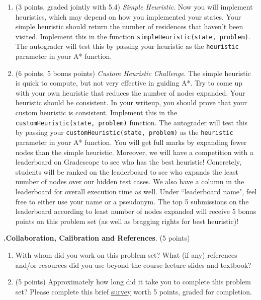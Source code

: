 \documentclass[12pt]{amsart}
\newenvironment{statement}[1]{\smallskip\noindent\color[rgb]{0.0,0.0,0.0} {\bf #1.}}{}
\theoremstyle{definition}
\theoremstyle{remark}
\newcommand{\1}{\mathds{1}}
\begin{document}
\begin{enumerate}
    \item (3 points, graded jointly with 5.4) \emph{Simple Heuristic}. Now you will implement heuristics, which may depend on how you implemented your states. 
 Your simple heuristic should return the number of residences that haven't been visited. Implement this in the function \texttt{simpleHeuristic(state, problem)}. The autograder will test this by passing your heuristic as the \texttt{heuristic} parameter in your A* function.

    \item (6 points, 5 bonus points)
\emph{Custom Heuristic Challenge}. The simple heuristic is quick to compute, but not very effective in guiding A*. Try to come up with your own heuristic that reduces the number of nodes expanded. Your heuristic should be consistent. In your writeup, you should prove that your custom heuristic is consistent. Implement this in the \texttt{customHeuristic(state, problem)}
function. The autograder will test this by passing your \texttt{customHeuristic(state, problem)} as the \texttt{heuristic} parameter in your A* function. You will get full marks by expanding fewer nodes than the simple heuristic. Moreover, we will have a competition with a leaderboard on Gradescope to see who has the best heuristic!
Concretely, students will be ranked on the leaderboard to see who expands the least number of nodes over our hidden test cases.
We also have a column in the leaderboard for overall execution time as well.
Under ``leaderboard name", feel free to either use your name or a pseudonym.
The top 5 submissions on the leaderboard according to least number of nodes expanded will receive 5 bonus points on this problem set (as well as bragging rights for best heuristic)!
\end{enumerate}


\newpage
\begin{statement}{6}
\noindent \textbf{Collaboration, Calibration and References}. (5 points)
\begin{enumerate}
    \item With whom did you work on this problem set? What (if any) references and/or resources did you use beyond the course lecture slides and textbook? 
    \item (5 points) Approximately how long did it take you to complete this problem set? Please complete this brief \href{https://forms.gle/TbUE8je3Rb2oG4Us9}{survey} worth 5 points, graded for completion.
\end{enumerate}
\end{statement}
\end{document}
